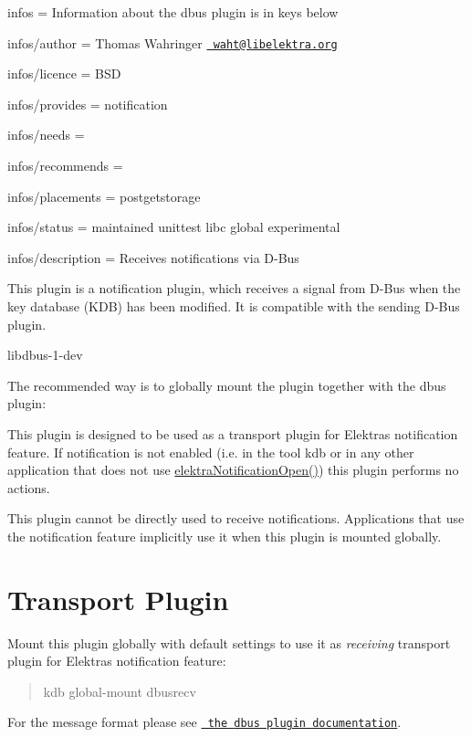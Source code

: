 
\begin{DoxyItemize}
\item infos = Information about the dbus plugin is in keys below
\item infos/author = Thomas Wahringer \href{mailto:waht@libelektra.org}{\texttt{ waht@libelektra.\+org}}
\item infos/licence = B\+SD
\item infos/provides = notification
\item infos/needs =
\item infos/recommends =
\item infos/placements = postgetstorage
\item infos/status = maintained unittest libc global experimental
\item infos/description = Receives notifications via D-\/\+Bus
\end{DoxyItemize}

This plugin is a notification plugin, which receives a signal from D-\/\+Bus when the key database (K\+DB) has been modified. It is compatible with the sending D-\/\+Bus plugin.


\begin{DoxyItemize}
\item {\ttfamily libdbus-\/1-\/dev}
\end{DoxyItemize}

The recommended way is to globally mount the plugin together with the dbus plugin\+:


\begin{DoxyCode}{0}
\end{DoxyCode}


This plugin is designed to be used as a transport plugin for Elektra\textquotesingle{}s notification feature. If notification is not enabled (i.\+e. in the tool {\ttfamily kdb} or in any other application that does not use {\ttfamily \mbox{\hyperlink{group__kdbnotification_gaeae96154abdb5fdbf1b34a01e2b23e44}{elektra\+Notification\+Open()}}}) this plugin performs no actions.

This plugin cannot be directly used to receive notifications. Applications that use the notification feature implicitly use it when this plugin is mounted globally.\hypertarget{autotoc_md174_autotoc_md177}{}\section{Transport Plugin}\label{autotoc_md174_autotoc_md177}
Mount this plugin globally with default settings to use it as {\itshape receiving} transport plugin for Elektra\textquotesingle{}s notification feature\+:

\begin{quote}
kdb global-\/mount dbusrecv \end{quote}


For the message format please see \href{https://www.libelektra.org/plugins/dbus\#notification-format}{\texttt{ the {\ttfamily dbus} plugin documentation}}. 